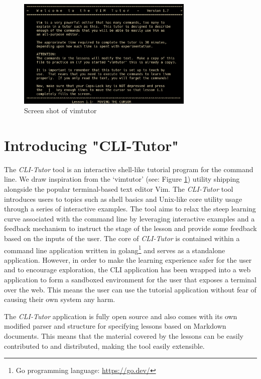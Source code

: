 \begin{figure}[htbp]
	\centering
	\includegraphics[width=0.75\textwidth]{img/vimtutor}
	\caption{Screen shot of vimtutor}
    \label{fig:vimtutor}
\end{figure}

\section{Introducing "CLI-Tutor"}

The \textit{CLI-Tutor} tool is an interactive shell-like tutorial program for
the command line. We draw inspiration from the
`vimtutor'\cite{pierce_ware_smith_moolenaar_2019} (see: Figure
\ref{fig:vimtutor}) utility shipping alongside the popular terminal-based text
editor Vim. The \textit{CLI-Tutor} tool introduces users to topics such as
shell basics and Unix-like core utility usage through a series of interactive
examples. The tool aims to relax the steep learning curve associated with the
command line by leveraging interactive examples and a feedback mechanism to
instruct the stage of the lesson and provide some feedback based on the inputs
of the user. The core of \textit{CLI-Tutor} is contained within a command line
application written in golang\footnote{Go programming language:
\href{https://go.dev/}{https://go.dev/}} and serves as a standalone
application. However, in order to make the learning experience safer for the
user and to encourage exploration, the CLI application has been wrapped into a
web application to form a sandboxed environment for the user that exposes a
terminal over the web. This means the user can use the tutorial application
without fear of causing their own system any harm. 

The \textit{CLI-Tutor} application is fully open source and also comes with its
own modified parser and structure for specifying lessons based on Markdown
documents. This means that the material covered by the lessons can be easily
contributed to and distributed, making the tool easily extensible.


